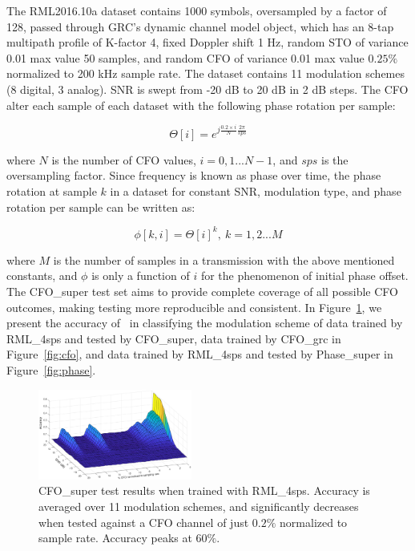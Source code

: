 The RML2016.10a dataset contains 1000 symbols, oversampled by a factor of 128, passed through GRC's dynamic channel model object, which has an 8-tap multipath profile of K-factor 4, fixed Doppler shift 1 Hz, random STO of variance 0.01 max value 50 samples, and random CFO of variance 0.01 max value $0.25\%$ normalized to 200 kHz sample rate. The dataset contains 11 modulation schemes (8 digital, 3 analog). SNR is swept from -20 dB to 20 dB in 2 dB steps. The CFO alter each sample of each dataset with the following phase rotation per sample:

\begin{equation}
\label{eq1}
\Theta[i] = e^{j\frac{0.2\times i}{N}\frac{2\pi}{sps}}
\end{equation}

\noindent where $N$ is the number of CFO values, $i = 0, 1...N-1$, and $sps$ is the oversampling factor. Since frequency is known as phase over time, the phase rotation at sample $k$ in a dataset for constant SNR, modulation type, and phase rotation per sample can be written as:

\begin{equation}
\label{eq4}
\phi[k, i] = \Theta[i]^k,~k=1,2...M
\end{equation}

\noindent where $M$ is the number of samples in a transmission with the above mentioned constants, and $\phi$ is only a function of $i$ for the phenomenon of initial phase offset. The CFO\_super test set aims to provide complete coverage of all possible CFO outcomes, making testing more reproducible and consistent. In Figure~\ref{fig:nocfo}, we present the accuracy of~\cite{o2016convolutional} in classifying the modulation scheme of data trained by RML\_4sps and tested by CFO\_super, data trained by CFO\_grc in Figure~\ref{fig:cfo}, and data trained by RML\_4sps and tested by Phase\_super in Figure~\ref{fig:phase}.

\begin{figure}[ht!]
	\centering	\includegraphics[width=0.45\textwidth,keepaspectratio]{figs/rml2016_nocfo.eps}
    \caption{CFO\_super test results when trained with RML\_4sps. Accuracy is averaged over 11 modulation schemes, and significantly decreases when tested against a CFO channel of just $0.2\%$ normalized to sample rate. Accuracy peaks at $60\%$.} 
\label{fig:nocfo}      
\end{figure}

